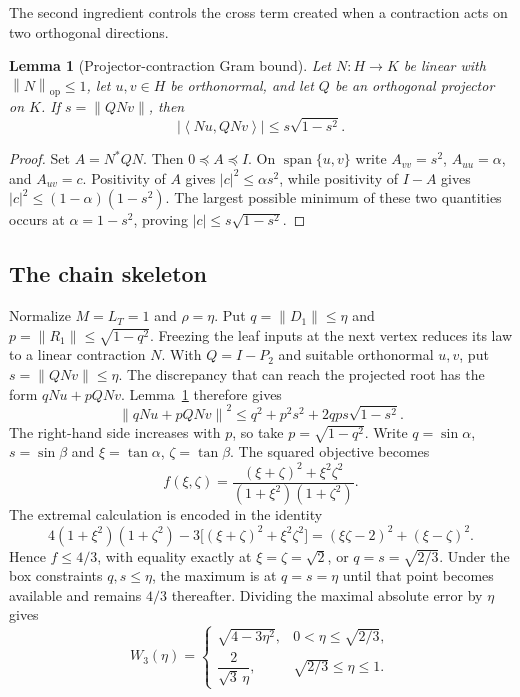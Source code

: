 \documentclass[11pt]{article}
\newtheorem{lemma}[theorem]{Lemma}
\theoremstyle{definition}
\newcommand{\op}{\mathrm{op}}
\newcommand{\norm}[1]{\left\lVert #1\right\rVert}
\newcommand{\ip}[2]{\left\langle #1,#2\right\rangle}
\begin{document}
The second ingredient controls the cross term created when a contraction acts
on two orthogonal directions.

\begin{lemma}[Projector-contraction Gram bound]\label{lem:gram}
Let $N:H\to K$ be linear with $\norm N_{\op}\le1$, let $u,v\in H$ be
orthonormal, and let $Q$ be an orthogonal projector on $K$.  If
$s=\norm{QNv}$, then
\begin{equation}\label{eq:gram-bound}
 \left|\ip{Nu}{QNv}\right|\le s\sqrt{1-s^2}.
\end{equation}
\end{lemma}
\begin{proof}
Set $A=N^*QN$.  Then $0\preceq A\preceq I$.  On
$\operatorname{span}\{u,v\}$ write $A_{vv}=s^2$, $A_{uu}=\alpha$, and
$A_{uv}=c$.  Positivity of $A$ gives $|c|^2\le\alpha s^2$, while positivity
of $I-A$ gives $|c|^2\le(1-\alpha)(1-s^2)$.  The largest possible minimum of
these two quantities occurs at $\alpha=1-s^2$, proving
$|c|\le s\sqrt{1-s^2}$.
\end{proof}

\subsection{The chain skeleton}

Normalize $M=L_T=1$ and $\rho=\eta$.  Put
$q=\norm{D_1}\le\eta$ and $p=\norm{R_1}\le\sqrt{1-q^2}$.  Freezing the leaf
inputs at the next vertex reduces its law to a linear contraction $N$.  With
$Q=I-P_2$ and suitable orthonormal $u,v$, put $s=\norm{QNv}\le\eta$.
The discrepancy that can reach the projected root has the form
$qNu+pQNv$.  Lemma~\ref{lem:gram} therefore gives
\begin{equation}\label{eq:chain-objective}
 \norm{qNu+pQNv}^2
 \le q^2+p^2s^2+2qps\sqrt{1-s^2}.
\end{equation}
The right-hand side increases with $p$, so take
$p=\sqrt{1-q^2}$.  Write $q=\sin\alpha$, $s=\sin\beta$ and
$\xi=\tan\alpha$, $\zeta=\tan\beta$.  The squared objective becomes
\begin{equation}\label{eq:f-objective}
 f(\xi,\zeta)=
 \frac{(\xi+\zeta)^2+\xi^2\zeta^2}
 {(1+\xi^2)(1+\zeta^2)}.
\end{equation}
The extremal calculation is encoded in the identity
\begin{equation}\label{eq:sos}
 4(1+\xi^2)(1+\zeta^2)
 -3\bigl[(\xi+\zeta)^2+\xi^2\zeta^2\bigr]
 =(\xi\zeta-2)^2+(\xi-\zeta)^2.
\end{equation}
Hence $f\le4/3$, with equality exactly at
$\xi=\zeta=\sqrt2$, or $q=s=\sqrt{2/3}$.  Under the box constraints
$q,s\le\eta$, the maximum is at $q=s=\eta$ until that point becomes
available and remains $4/3$ thereafter.  Dividing the maximal absolute error
by $\eta$ gives
\begin{equation}\label{eq:w3}
 W_3(\eta)=
 \begin{cases}
 \sqrt{4-3\eta^2},&0<\eta\le\sqrt{2/3},\\[1mm]
 \dfrac{2}{\sqrt3\,\eta},&\sqrt{2/3}\le\eta\le1.
 \end{cases}
\end{equation}
\end{document}
